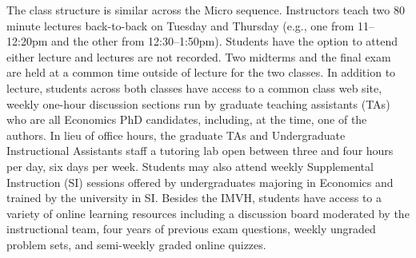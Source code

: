 \documentclass[12pt]{article}
\begin{document}
The class structure is similar across the Micro sequence.
Instructors teach two 80 minute lectures back-to-back on Tuesday and Thursday (e.g., one from 11--12:20pm and the other from 12:30--1:50pm).
Students have the option to attend either lecture and lectures are not recorded.
Two midterms and the final exam are held at a common time outside of lecture for the two classes.
In addition to lecture, students across both classes have access to a common class web site, weekly one-hour discussion sections run by graduate teaching assistants (TAs) who are all Economics PhD candidates, including, at the time, one of the authors.
In lieu of office hours, the graduate TAs and Undergraduate Instructional Assistants staff a tutoring lab open between three and four hours per day, six days per week.
Students may also attend weekly Supplemental Instruction (SI) sessions offered by undergraduates majoring in Economics and trained by the university in SI. Besides the IMVH, students have access to a variety of online learning resources including a discussion board moderated by the instructional team, four years of previous exam questions, weekly ungraded problem sets, and semi-weekly graded online quizzes.

\end{document}
